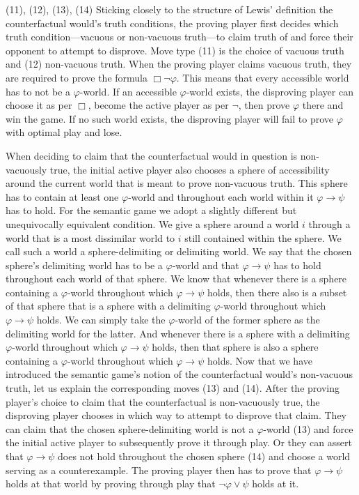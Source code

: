 \documentclass[a4paper,american,10pt]{paper}
\theoremstyle{definition}\newtheorem{definition}{Definition}
\begin{document}
(11), (12), (13), (14) Sticking closely to the structure of Lewis' definition the counterfactual would's truth conditions, the proving player first decides which truth condition---vacuous or non-vacuous truth---to claim truth of and force their opponent to attempt to disprove. Move type (11) is the choice of vacuous truth and (12) non-vacuous truth. When the proving player claims vacuous truth, they are required to prove the formula $\Box\neg\varphi$. This means that every accessible world has to not be a $\varphi$-world. If an accessible $\varphi$-world exists, the disproving player can choose it as per $\Box$, become the active player as per $\neg$, then prove $\varphi$ there and win the game. If no such world exists, the disproving player will fail to prove $\varphi$ with optimal play and lose.

When deciding to claim that the counterfactual would in question is non-vacuously true, the initial active player also chooses a sphere of accessibility around the current world that is meant to prove non-vacuous truth. This sphere has to contain at least one $\varphi$-world and throughout each world within it $\varphi\rightarrow\psi$ has to hold. For the semantic game we adopt a slightly different but unequivocally equivalent condition. We give a sphere around a world $i$ through a world that is a most dissimilar world to $i$ still contained within the sphere. We call such a world a sphere-delimiting or delimiting world. We say that the chosen sphere's delimiting world has to be a $\varphi$-world and that $\varphi\rightarrow\psi$ has to hold throughout each world of that sphere. We know that whenever there is a sphere containing a $\varphi$-world throughout which $\varphi\rightarrow\psi$ holds, then there also is a subset of that sphere that is a sphere with a delimiting $\varphi$-world throughout which $\varphi\rightarrow\psi$ holds. We can simply take the $\varphi$-world of the former sphere as the delimiting world for the latter. And whenever there is a sphere with a delimiting $\varphi$-world throughout which $\varphi\rightarrow\psi$ holds, then that sphere is also a sphere containing a $\varphi$-world throughout which $\varphi\rightarrow\psi$ holds. Now that we have introduced the semantic game's notion of the counterfactual would's non-vacuous truth, let us explain the corresponding moves (13) and (14). After the proving player's choice to claim that the counterfactual is non-vacuously true, the disproving player chooses in which way to attempt to disprove that claim. They can claim that the chosen sphere-delimiting world is not a $\varphi$-world (13) and force the initial active player to subsequently prove it through play. Or they can assert that $\varphi\rightarrow\psi$ does not hold throughout the chosen sphere (14) and choose a world serving as a counterexample. The proving player then has to prove that $\varphi\rightarrow\psi$ holds at that world by proving through play that $\neg\varphi\vee\psi$ holds at it.
\end{document}
